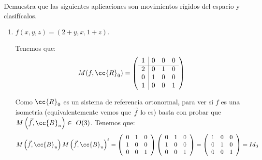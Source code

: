 \begin{ejercicio}
    Demuestra que las siguientes aplicaciones son movimientos rígidos del espacio y clasifícalos.
    \begin{enumerate}
        \item $f\left(x, y, z\right) = \left(2 + y, x, 1 + z\right)$.

        Tenemos que:
        \begin{equation*}
            M(f,\cc{R}_0) = \left(\begin{array}{c|ccc}
                1 & 0 & 0 & 0 \\ \hline
                2 & 0 & 1 & 0 \\
                0 & 1 & 0 & 0 \\
                1 & 0 & 0 & 1 
            \end{array}\right)
        \end{equation*}

        Como $\cc{R}_0$ es un sistema de referencia ortonormal, para ver si $f$ es una isometría (equivalentemente vemos que $\vec{f}$ lo es) basta con probar que $M\left(\vec{f}, \cc{B}_u\right)\in~O(3)$. Tenemos que:
        \begin{equation*}
            M\left(\vec{f},\cc{B}_u\right)M\left(\vec{f},\cc{B}_u\right)^t
            = 
            \left(
            \begin{array}{ccc}
                0 & 1 & 0 \\
                1 & 0 & 0 \\
                0 & 0 & 1 
            \end{array}
            \right)
            \left(
            \begin{array}{ccc}
                0 & 1 & 0 \\
                1 & 0 & 0 \\
                0 & 0 & 1 
            \end{array}
            \right)
            = 
            \left(
            \begin{array}{ccc}
                1 & 0 & 0\\
                0 & 1 & 0\\
                0 & 0 & 1
            \end{array}
            \right) = Id_3
        \end{equation*}


\end{enumerate}
\end{ejercicio}
